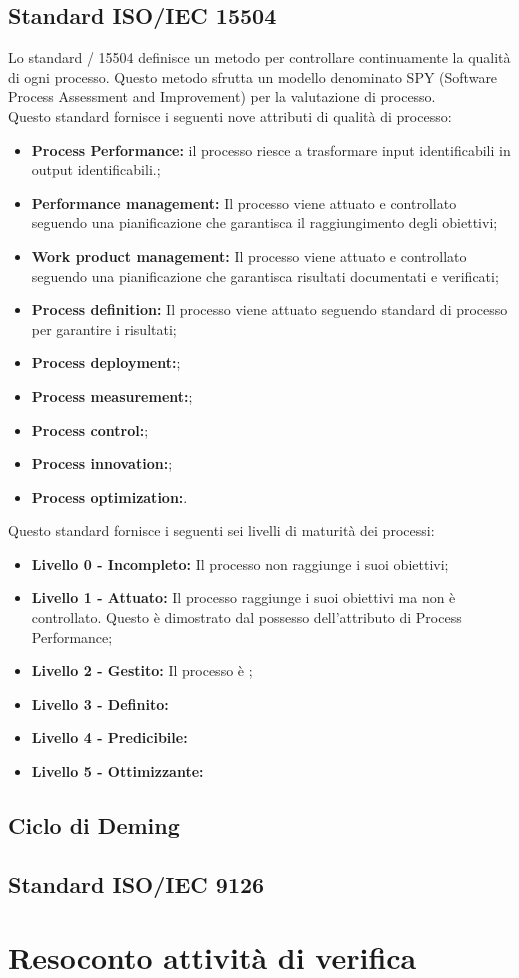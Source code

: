 \documentclass{scalatekids-article}
\begin{document}
\subsection{Standard ISO/IEC 15504}
\label{sec:ISO/IEC15504}
Lo standard / 15504 definisce un metodo per controllare continuamente la qualità di ogni processo. Questo metodo sfrutta un modello denominato SPY (Software Process Assessment and Improvement) per la valutazione di processo.\\
Questo standard fornisce i seguenti nove attributi di qualità di processo:
\begin{itemize}
\item{\textbf{Process Performance:} il processo riesce a trasformare input identificabili in output identificabili.;}
\item{\textbf{Performance management:} Il processo viene attuato e controllato seguendo una pianificazione che garantisca il raggiungimento degli obiettivi;}
\item{\textbf{Work product management:} Il processo viene attuato e controllato seguendo una pianificazione che garantisca risultati documentati e verificati;}
\item{\textbf{Process definition:} Il processo viene attuato seguendo standard di processo per garantire i risultati;}
\item{\textbf{Process deployment:};}
\item{\textbf{Process measurement:};}
\item{\textbf{Process control:};}
\item{\textbf{Process innovation:};}
\item{\textbf{Process optimization:}.}
\end{itemize}
Questo standard fornisce i seguenti sei livelli di maturità dei processi:
\begin{itemize}
\item{\textbf{Livello 0 - Incompleto:} Il processo non raggiunge i suoi obiettivi;}
\item{\textbf{Livello 1 - Attuato:} Il processo raggiunge i suoi obiettivi ma non è controllato. Questo è dimostrato dal possesso dell'attributo di Process Performance;}
\item{\textbf{Livello 2 - Gestito:} Il processo è ;}
\item{\textbf{Livello 3 - Definito:}}
\item{\textbf{Livello 4 - Predicibile:}}
\item{\textbf{Livello 5 - Ottimizzante:}}
\end{itemize}
\subsection{Ciclo di Deming}
\label{PDCA}
\subsection{Standard ISO/IEC 9126}
\label{sec:ISO/IEC9126}
\section{Resoconto attività di verifica}
\label{sec:resAttivitaVerifica}
\end{document}
